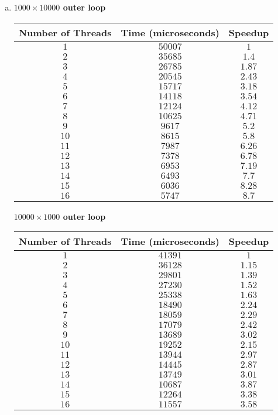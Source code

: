 \documentclass[10pt]{article} %
\begin{document}
\begin{enumerate}[1.]
\begin{enumerate}[(a)]
\item %

\textbf{$1000 \times 10000$ outer loop}
\begin{center}
\begin{tabular}{| c | c | c |}
\hline
Number of Threads & Time (microseconds) & Speedup \\
\hline
$1$ & $50007$ & $1$ \\
$2$ & $35685$ & $1.4$ \\
$3$ & $26785$ & $1.87$ \\
$4$ & $20545$ & $2.43$ \\
$5$ & $15717$ & $3.18$ \\
$6$ & $14118$ & $3.54$ \\
$7$ & $12124$ & $4.12$ \\
$8$ & $10625$ & $4.71$ \\
$9$ & $9617$ & $5.2$ \\
$10$ & $8615$ & $5.8$ \\
$11$ & $7987$ & $6.26$ \\
$12$ & $7378$ & $6.78$ \\
$13$ & $6953$ & $7.19$ \\
$14$ & $6493$ & $7.7$ \\
$15$ & $6036$ & $8.28$ \\
$16$ & $5747$ & $8.7$ \\
\hline
\end{tabular}
\end{center}

\textbf{$10000 \times 1000$ outer loop}
\begin{center}
\begin{tabular}{| c | c | c |}
\hline
Number of Threads & Time (microseconds) & Speedup \\
\hline
$1$ & $41391$ & $1$ \\
$2$ & $36128$ & $1.15$ \\
$3$ & $29801$ & $1.39$ \\
$4$ & $27230$ & $1.52$ \\
$5$ & $25338$ & $1.63$ \\
$6$ & $18490$ & $2.24$ \\
$7$ & $18059$ & $2.29$ \\
$8$ & $17079$ & $2.42$ \\
$9$ & $13689$ & $3.02$ \\
$10$ & $19252$ & $2.15$ \\
$11$ & $13944$ & $2.97$ \\
$12$ & $14445$ & $2.87$ \\
$13$ & $13749$ & $3.01$ \\
$14$ & $10687$ & $3.87$ \\
$15$ & $12264$ & $3.38$ \\
$16$ & $11557$ & $3.58$ \\
\hline
\end{tabular}
\end{center}


\end{enumerate}
\end{enumerate}
\end{document}
